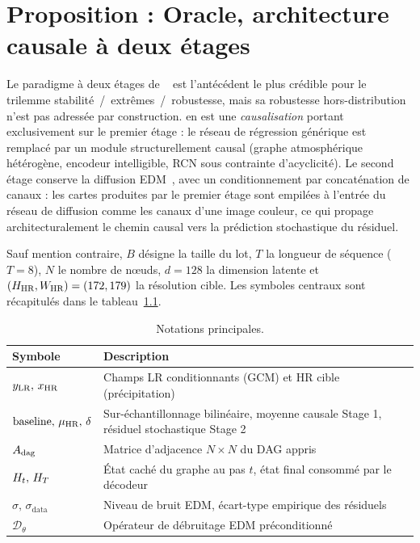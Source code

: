 \chapter{Proposition : Oracle, architecture causale à deux étages}
\label{chap:oracle}


\vspace{0.5em}

\label{sec:oracle-intro}

Le paradigme à deux étages de \CorrDiff{}~\cite{mardani_corrdiff_2023} est l'antécédent le plus crédible pour le trilemme stabilité~/~extrêmes~/~robustesse, mais sa robustesse hors-distribution n'est pas adressée par construction. \Oracle{} en est une \emph{causalisation} portant exclusivement sur le premier étage : le réseau de régression générique est remplacé par un module structurellement causal (graphe atmosphérique hétérogène, encodeur intelligible, RCN sous contrainte d'acyclicité). Le second étage conserve la diffusion EDM~\cite{karras_edm_2022}, avec un conditionnement par concaténation de canaux : les cartes produites par le premier étage sont empilées à l'entrée du réseau de diffusion comme les canaux d'une image couleur, ce qui propage architecturalement le chemin causal vers la prédiction stochastique du résiduel.

Sauf mention contraire, $B$ désigne la taille du lot, $T$ la longueur de séquence ($T=8$), $N$ le nombre de nœuds, $d=128$ la dimension latente et $(H_{\text{HR}}, W_{\text{HR}})=(172,179)$ la résolution cible. Les symboles centraux sont récapitulés dans le tableau~\ref{tab:notations}.

\begin{table}[ht]
  \centering
  \small
  \caption{Notations principales.}
  \label{tab:notations}
  \begin{tabularx}{\linewidth}{l X}
    \toprule
    \textbf{Symbole} & \textbf{Description} \\
    \midrule
    $y_{\text{LR}},\,x_{\text{HR}}$ & Champs LR conditionnants (GCM) et HR cible (précipitation) \\
    $\mathrm{baseline},\,\mu_{\text{HR}},\,\delta$ & Sur-échantillonnage bilinéaire, moyenne causale Stage 1, résiduel stochastique Stage 2 \\
    $A_{\mathrm{dag}}$ & Matrice d'adjacence $N\times N$ du DAG appris \\
    $H_t,\,H_T$ & État caché du graphe au pas $t$, état final consommé par le décodeur \\
    $\sigma,\,\sigma_{\mathrm{data}}$ & Niveau de bruit EDM, écart-type empirique des résiduels \\
    $\mathcal{D}_\theta$ & Opérateur de débruitage EDM préconditionné \\
    \bottomrule
  \end{tabularx}
\end{table}

